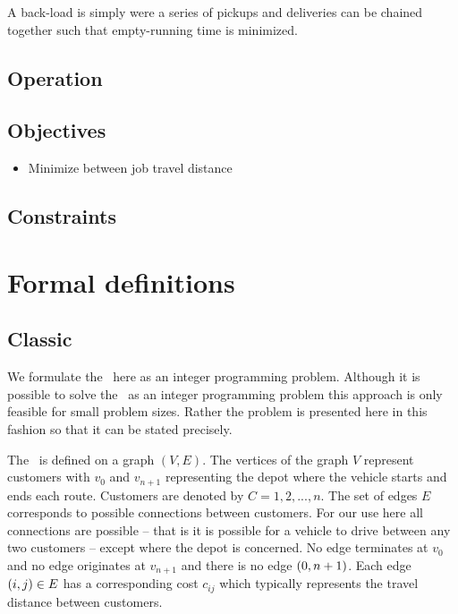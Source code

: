 A back-load is simply were a series of pickups and deliveries can be chained together such that empty-running time is minimized.

\subsection{Operation}


\subsection{Objectives}

\begin{itemize}
	\item Minimize between job travel distance
\end{itemize}

\subsection{Constraints}


\section{Formal definitions}

\subsection{Classic \VRP}
We formulate the \VRP\ here as an integer programming problem. Although it is possible to solve the \VRP\ as an integer programming problem this approach is only feasible for small problem sizes. Rather the problem is presented here in this fashion so that it can be stated precisely.
 
The \VRP\ is defined on a graph $(V,E)$. The vertices of the graph $V$ represent customers with $v_0$ and $v_{n+1}$ representing the depot where the vehicle starts and ends each route. Customers are denoted by $C = 1,2,...,n$. The set of edges $E$ corresponds to possible connections between customers. For our use here all connections are possible -- that is it is possible for a vehicle to drive between any two customers -- except where the depot is concerned. No edge terminates at $v_0$ and no edge originates at $v_{n+1}$ and there is no edge $(0,n+1)$. Each edge $(i,j) \in E$ has a corresponding cost $c_{ij}$ which typically represents the travel distance between customers.

